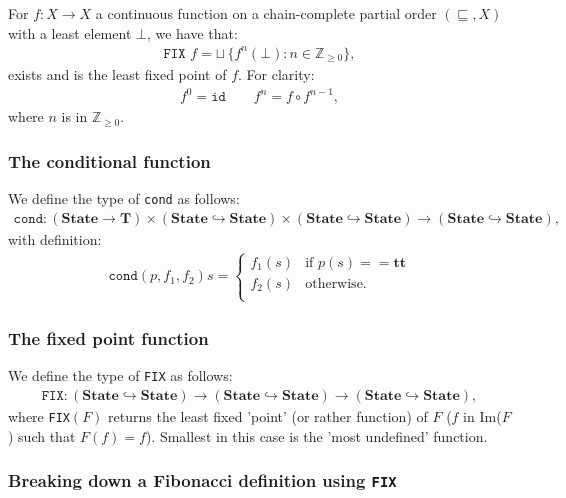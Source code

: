 \documentclass[a4paper, 12pt, twoside]{article}
\begin{document}
For $f : X \to X$ a continuous function on a chain-complete partial order
$(\sqsubseteq, X)$ with a least element $\bot$, we have that: \begin{gather*}
  \texttt{FIX } f = \sqcup \, \{f^n(\bot) : n \in \mathbb{Z}_{\geq 0}\},
\end{gather*} exists and is the least fixed point of $f$. For clarity: 
\begin{gather*}
  f^0 = \texttt{id} \qquad f^n = f \circ f^{n - 1},
\end{gather*} where $n$ is in $\mathbb{Z}_{\geq 0}$.

\subsubsection{The conditional function}

We define the type of \texttt{cond} as follows: \begin{gather*}
  \texttt{cond} : 
  (\textbf{State} \to \textbf{T}) \times
  (\textbf{State} \hookrightarrow \textbf{State}) \times
  (\textbf{State} \hookrightarrow \textbf{State}) \to
  (\textbf{State} \hookrightarrow \textbf{State}),
\end{gather*} with definition: \begin{gather*}
  \texttt{cond}(p, f_1, f_2)s = \begin{cases}
    f_1(s) & \text{if } p(s) == \textbf{tt} \\
    f_2(s) & \text{otherwise.} \\
  \end{cases}
\end{gather*}

\subsubsection{The fixed point function}

We define the type of \texttt{FIX} as follows: \begin{gather*}
  \texttt{FIX} : 
  (\textbf{State} \hookrightarrow \textbf{State}) \to
  (\textbf{State} \hookrightarrow \textbf{State}) \to
  (\textbf{State} \hookrightarrow \textbf{State}),
\end{gather*} where \texttt{FIX}$(F)$ returns the least fixed 'point'
(or rather function) of $F$ ($f$ in Im($F$) such that $F(f) = f$). 
Smallest in this case is the 'most undefined' function.

\vfill

\subsubsection{Breaking down a Fibonacci definition using \texttt{FIX}}
\end{document}
